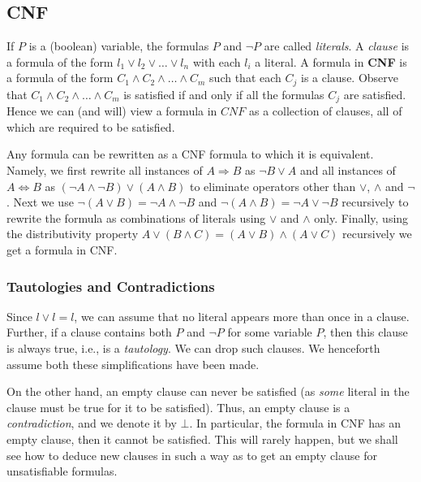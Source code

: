 \hypertarget{cnf}{%
\subsection{CNF}\label{cnf}}

If \(P\) is a (boolean) variable, the formulas \(P\) and \(\neg P\) are
called \emph{literals}. A \emph{clause} is a formula of the form
\(l_1\vee l_2\vee\dots\vee l_n\) with each \(l_i\) a literal. A formula
in \textbf{CNF} is a formula of the form
\(C_1\wedge C_2\wedge\dots\wedge C_m\) such that each \(C_j\) is a
clause. Observe that \(C_1\wedge C_2\wedge\dots\wedge C_m\) is satisfied
if and only if all the formulas \(C_j\) are satisfied. Hence we can (and
will) view a formula in \(CNF\) as a collection of clauses, all of which
are required to be satisfied.

Any formula can be rewritten as a CNF formula to which it is equivalent.
Namely, we first rewrite all instances of \(A\Rightarrow B\) as
\(\neg B\vee A\) and all instances of \(A\Leftrightarrow B\) as
\((\neg A\wedge \neg B)\vee (A\wedge B)\) to eliminate operators other
than \(\vee\), \(\wedge\) and \(\neg\). Next we use
\(\neg(A \vee B) = \neg A \wedge \neg B\) and
\(\neg(A \wedge B) = \neg A \vee \neg B\) recursively to rewrite the
formula as combinations of literals using \(\vee\) and \(\wedge\) only.
Finally, using the distributivity property
\(A \vee (B\wedge C)= (A\vee B)\wedge (A \vee C)\) recursively we get a
formula in CNF.

\hypertarget{tautologies-and-contradictions}{%
\subsubsection{Tautologies and
Contradictions}\label{tautologies-and-contradictions}}

Since \(l\vee l = l\), we can assume that no literal appears more than
once in a clause. Further, if a clause contains both \(P\) and
\(\neg P\) for some variable \(P\), then this clause is always true,
i.e., is a \emph{tautology}. We can drop such clauses. We henceforth
assume both these simplifications have been made.

On the other hand, an empty clause can never be satisfied (as
\emph{some} literal in the clause must be true for it to be satisfied).
Thus, an empty clause is a \emph{contradiction}, and we denote it by
\(\bot\). In particular, the formula in CNF has an empty clause, then it
cannot be satisfied. This will rarely happen, but we shall see how to
deduce new clauses in such a way as to get an empty clause for
unsatisfiable formulas.

